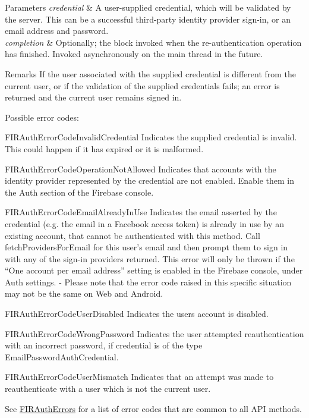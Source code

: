 \begin{DoxyParams}{Parameters}
{\em credential} & A user-\/supplied credential, which will be validated by the server. This can be a successful third-\/party identity provider sign-\/in, or an email address and password. \\
\hline
{\em completion} & Optionally; the block invoked when the re-\/authentication operation has finished. Invoked asynchronously on the main thread in the future. \\
\hline
\end{DoxyParams}
\begin{DoxyRemark}{Remarks}
If the user associated with the supplied credential is different from the current user, or if the validation of the supplied credentials fails; an error is returned and the current user remains signed in. 

Possible error codes\+:
\begin{DoxyItemize}
\item {\ttfamily F\+I\+R\+Auth\+Error\+Code\+Invalid\+Credential} Indicates the supplied credential is invalid. This could happen if it has expired or it is malformed.
\item {\ttfamily F\+I\+R\+Auth\+Error\+Code\+Operation\+Not\+Allowed} Indicates that accounts with the identity provider represented by the credential are not enabled. Enable them in the Auth section of the Firebase console.
\item {\ttfamily F\+I\+R\+Auth\+Error\+Code\+Email\+Already\+In\+Use} Indicates the email asserted by the credential (e.\+g. the email in a Facebook access token) is already in use by an existing account, that cannot be authenticated with this method. Call fetch\+Providers\+For\+Email for this user’s email and then prompt them to sign in with any of the sign-\/in providers returned. This error will only be thrown if the “\+One account per email address” setting is enabled in the Firebase console, under Auth settings. -\/ Please note that the error code raised in this specific situation may not be the same on Web and Android.
\item {\ttfamily F\+I\+R\+Auth\+Error\+Code\+User\+Disabled} Indicates the user\textquotesingle{}s account is disabled.
\item {\ttfamily F\+I\+R\+Auth\+Error\+Code\+Wrong\+Password} Indicates the user attempted reauthentication with an incorrect password, if credential is of the type Email\+Password\+Auth\+Credential.
\item {\ttfamily F\+I\+R\+Auth\+Error\+Code\+User\+Mismatch} Indicates that an attempt was made to reauthenticate with a user which is not the current user.
\item See {\ttfamily \hyperlink{interface_f_i_r_auth_errors}{F\+I\+R\+Auth\+Errors}} for a list of error codes that are common to all A\+P\+I methods. 
\end{DoxyItemize}
\end{DoxyRemark}
\hypertarget{interface_f_i_r_user_ac9a4e0578dcbe4abee62143fa2b25f66}{}
